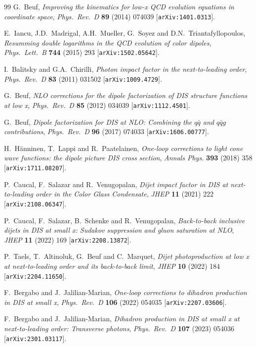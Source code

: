 \documentclass[11pt,a4paper]{article}
\numberwithin{equation}{section}
\begin{document}
\begin{thebibliography}{99}
G.~Beuf, \emph{Improving the kinematics for low-x QCD evolution equations in coordinate
space}, \emph{Phys.\ Rev.\ D} {\bf 89} (2014) 074039 [\texttt{arXiv:1401.0313}].

E.~Iancu, J.D.~Madrigal, A.H.~Mueller, G.~Soyez and D.N.~Triantafyllopoulos,
\emph{Resumming double logarithms in the QCD evolution of color dipoles}, \emph{Phys.\
Lett.\ B} {\bf 744} (2015) 293 [\texttt{arXiv:1502.05642}].

I.~Balitsky and G.A.~Chirilli, \emph{Photon impact factor in the next-to-leading order},
\emph{Phys.\ Rev.\ D} {\bf 83} (2011) 031502 [\texttt{arXiv:1009.4729}].

G.~Beuf, \emph{NLO corrections for the dipole factorization of DIS structure functions at low
x}, \emph{Phys.\ Rev.\ D} {\bf 85} (2012) 034039 [\texttt{arXiv:1112.4501}].

G.~Beuf, \emph{Dipole factorization for DIS at NLO: Combining the $q\bar q$ and $q\bar qg$
contributions}, \emph{Phys.\ Rev.\ D} {\bf 96} (2017) 074033 [\texttt{arXiv:1606.00777}].

H.~H\"anninen, T.~Lappi and R.~Paatelainen, \emph{One-loop corrections to light cone wave
functions: the dipole picture DIS cross section}, \emph{Annals Phys.} {\bf 393} (2018) 358
[\texttt{arXiv:1711.08207}].

P.~Caucal, F.~Salazar and R.~Venugopalan, \emph{Dijet impact factor in DIS at
next-to-leading order in the Color Glass Condensate}, \emph{JHEP} {\bf 11} (2021) 222
[\texttt{arXiv:2108.06347}].

P.~Caucal, F.~Salazar, B.~Schenke and R.~Venugopalan, \emph{Back-to-back inclusive dijets in
DIS at small x: Sudakov suppression and gluon saturation at NLO}, \emph{JHEP} {\bf 11}
(2022) 169 [\texttt{arXiv:2208.13872}].

P.~Taels, T.~Altinoluk, G.~Beuf and C.~Marquet, \emph{Dijet photoproduction at low x at
next-to-leading order and its back-to-back limit}, \emph{JHEP} {\bf 10} (2022) 184
[\texttt{arXiv:2204.11650}].

F.~Bergabo and J.~Jalilian-Marian, \emph{One-loop corrections to dihadron production in DIS
at small x}, \emph{Phys.\ Rev.\ D} {\bf 106} (2022) 054035 [\texttt{arXiv:2207.03606}].

F.~Bergabo and J.~Jalilian-Marian, \emph{Dihadron production in DIS at small x at
next-to-leading order: Transverse photons}, \emph{Phys.\ Rev.\ D} {\bf 107} (2023) 054036
[\texttt{arXiv:2301.03117}].


\end{thebibliography}
\end{document}

